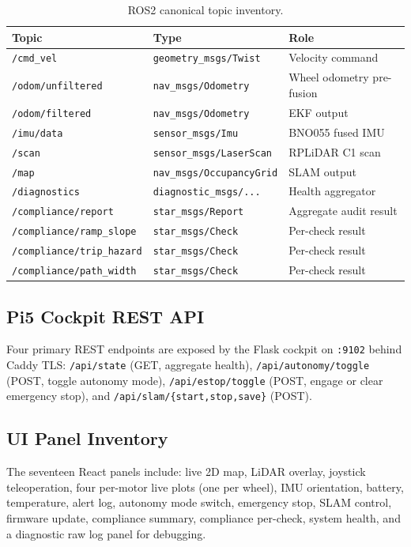 \documentclass[11pt,letterpaper]{article}
\begin{document}
\begin{table}[H]
\centering
\caption{ROS2 canonical topic inventory.}
\label{tab:ros2-topics}
\small
\begin{tabularx}{\linewidth}{l l X}
\toprule
\textbf{Topic} & \textbf{Type} & \textbf{Role} \\
\midrule
\texttt{/cmd\_vel}                   & \texttt{geometry\_msgs/Twist} & Velocity command \\
\texttt{/odom/unfiltered}            & \texttt{nav\_msgs/Odometry}   & Wheel odometry pre-fusion \\
\texttt{/odom/filtered}              & \texttt{nav\_msgs/Odometry}   & EKF output \\
\texttt{/imu/data}                   & \texttt{sensor\_msgs/Imu}     & BNO055 fused IMU \\
\texttt{/scan}                       & \texttt{sensor\_msgs/LaserScan} & RPLiDAR C1 scan \\
\texttt{/map}                        & \texttt{nav\_msgs/OccupancyGrid} & SLAM output \\
\texttt{/diagnostics}                & \texttt{diagnostic\_msgs/...} & Health aggregator \\
\texttt{/compliance/report}          & \texttt{star\_msgs/Report}    & Aggregate audit result \\
\texttt{/compliance/ramp\_slope}     & \texttt{star\_msgs/Check}     & Per-check result \\
\texttt{/compliance/trip\_hazard}    & \texttt{star\_msgs/Check}     & Per-check result \\
\texttt{/compliance/path\_width}     & \texttt{star\_msgs/Check}     & Per-check result \\
\bottomrule
\end{tabularx}
\end{table}

\subsection{Pi5 Cockpit REST API}
Four primary REST endpoints are exposed by the Flask cockpit on
\texttt{:9102} behind Caddy TLS: \texttt{/api/state} (GET, aggregate
health), \texttt{/api/autonomy/toggle} (POST, toggle autonomy mode),
\texttt{/api/estop/toggle} (POST, engage or clear emergency stop),
and \texttt{/api/slam/\{start,stop,save\}} (POST).

\subsection{UI Panel Inventory}
The seventeen React panels include: live 2D map, LiDAR overlay,
joystick teleoperation, four per-motor live plots (one per wheel),
IMU orientation, battery, temperature, alert log, autonomy mode
switch, emergency stop, SLAM control, firmware update, compliance
summary, compliance per-check, system health, and a diagnostic raw
log panel for debugging.
\end{document}
